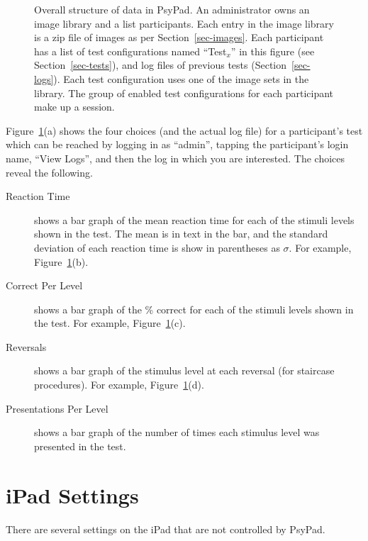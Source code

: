 \documentclass{article}
\begin{document}
\begin{figure}
\begin{center}
\caption{\label{fig-anal}Overall structure of data in PsyPad.
An administrator owns an image library and a list participants.
Each entry in the image library is a zip file of images as per
Section~\ref{sec-images}. Each participant has a list of test
configurations named ``Test$_x$'' in this figure (see Section~\ref{sec-tests}), 
and log files of
previous tests (Section~\ref{sec-logs}). 
Each test configuration uses one of the image sets in
the library. 
The group of enabled test configurations for each
participant make up a session.}

\end{center}
\end{figure}

Figure~\ref{fig-anal}(a) shows the four choices (and the actual log
file) for a participant's test which can be reached by logging in
as ``admin'', tapping the participant's login name, ``View Logs'',
and then the log in which you are interested.
The choices reveal the following.
\begin{description}

\item[Reaction Time] shows a bar graph of the mean reaction time for 
each of the stimuli levels shown in the test. The mean is in text in the bar, and the 
standard deviation of each reaction time is show in parentheses as $\sigma$.
For example, Figure~\ref{fig-anal}(b).


\item[Correct Per Level] shows a bar graph of the \% correct for 
each of the stimuli levels shown in the test. 
For example, Figure~\ref{fig-anal}(c).

\item[Reversals] shows a bar graph of the stimulus level at each reversal (for staircase procedures).
For example, Figure~\ref{fig-anal}(d).

\item[Presentations Per Level] shows a bar graph of the number of times each 
stimulus level was presented in the test.

\end{description}


\section{iPad Settings}
\label{sec-ipad}

There are several settings on the iPad that are not controlled by PsyPad.
\end{document}

